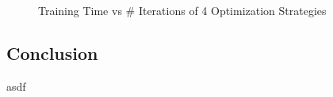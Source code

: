 \documentclass[h]{article}
\begin{document}
\begin{figure}[H]
      \caption*{Training Time vs # Iterations of 4 Optimization Strategies} 
   \endminipage\hfill
\end{figure}

\subsection*{ Conclusion}  
asdf

%
\end{document}
